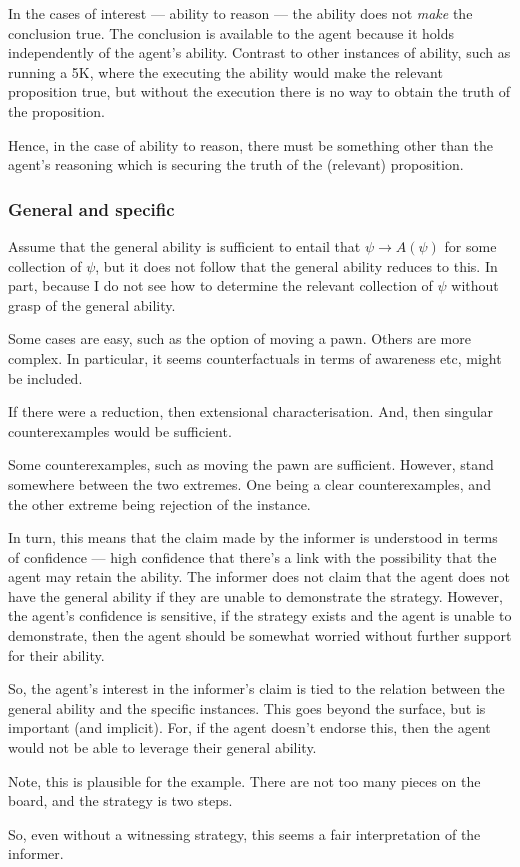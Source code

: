 \documentclass[10pt]{article}
\begin{document}
\begin{note}
  In the cases of interest --- ability to reason --- the ability does not \emph{make} the conclusion true.
  The conclusion is available to the agent because it holds independently of the agent's ability.
  Contrast to other instances of ability, such as running a 5K, where the executing the ability would make the relevant proposition true, but without the execution there is no way to obtain the truth of the proposition.

  Hence, in the case of ability to reason, there must be something other than the agent's reasoning which is securing the truth of the (relevant) proposition.
\end{note}

\subsubsection{General and specific}
\label{sec:general-specific}

\begin{note}[GandS]
Assume that the general ability is sufficient to entail that \(\psi \rightarrow A(\psi)\) for some collection of \(\psi\), but it does not follow that the general ability reduces to this.
  In part, because I do not see how to determine the relevant collection of \(\psi\) without grasp of the general ability.

  Some cases are easy, such as the option of moving a pawn.
  Others are more complex.
  In particular, it seems counterfactuals in terms of awareness etc, might be included.

  If there were a reduction, then extensional characterisation.
  And, then singular counterexamples would be sufficient.

  Some counterexamples, such as moving the pawn are sufficient.
  However, stand somewhere between the two extremes.
  One being a clear counterexamples, and the other extreme being rejection of the instance.

  In turn, this means that the claim made by the informer is understood in terms of confidence --- high confidence that there's a link with the possibility that the agent may retain the ability.
  The informer does not claim that the agent does not have the general ability if they are unable to demonstrate the strategy.
  However, the agent's confidence is sensitive, if the strategy exists and the agent is unable to demonstrate, then the agent should be somewhat worried without further support for their ability.

  So, the agent's interest in the informer's claim is tied to the relation between the general ability and the specific instances.
  This goes beyond the surface, but is important (and implicit).
  For, if the agent doesn't endorse this, then the agent would not be able to leverage their general ability.

  Note, this is plausible for the example.
  There are not too many pieces on the board, and the strategy is two steps.

  So, even without a witnessing strategy, this seems a fair interpretation of the informer.
\end{note}
\end{document}
